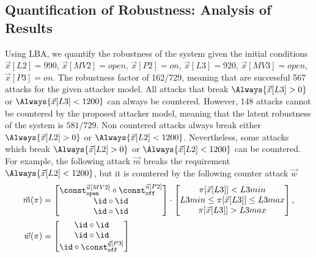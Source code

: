 {\subsection{Quantification of Robustness: Analysis of Results}
Using LBA, we quantify the robustness of the system given the initial conditions $\vec{x}[L2]=990$, $\vec{x}[MV2]=open$, $\vec{x}[P2]=on$, $\vec{x}[L3]=920$, $\vec{x}[MV3]=open$, $\vec{x}[P3]=on$. The robustness factor of 162/729, meaning that are successful 567 attacks for the given attacker model. All attacks that break $\Always{\vec{x}[L3]>0}$ or $\Always{\vec{x}[L3]<1200}$ can always be countered. However, 148 attacks cannot be countered by the proposed attacker model, meaning that the latent robustness of the system is $581/729$. Non countered attacks always break either $\Always{\vec{x}[L2]>0}$ or $\Always{\vec{x}[L2]<1200}$. Nevertheless, some attacks which break $\Always{\vec{x}[L2]>0}$ or $\Always{\vec{x}[L2]<1200}$ can be countered. For example, the following attack $\vec{m}$ breaks the requirement $\Always{\vec{x}[L2]<1200}$, but it is countered by the following counter attack $\vec{w}$ 
\begin{align*}
  \vec{m}(\pi)&=
  \begin{bmatrix}
   \const^{\vec{u}[MV2]}_{\texttt{open}}\circ \const^{\vec{u}[P2]}_{\texttt{off}} \\
   \id\circ \id \\
   \id\circ \id \\
  \end{bmatrix}
  \cdot
  \begin{bmatrix}
    \pi[\vec{x}[L3]]<L3min \\
    L3min \leq \pi[\vec{x}[L3]]\leq L3max \\
    \pi[\vec{x}[L3]]>L3max
  \end{bmatrix},\\
  \vec{w}(\pi)&=
  \begin{bmatrix}
    \id\circ \id \\
    \id\circ \id \\
    \id\circ \const^{\vec{q}[P3]}_{\texttt{off}} \\
  \end{bmatrix}

\end{align*}}
